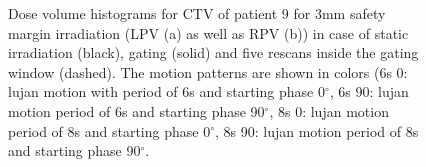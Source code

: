 \begin{figure}[H]
\begin{center}
{ }
\caption{Dose volume histograms for CTV of patient 9 for 3mm safety margin irradiation (LPV (a) as well as RPV (b)) in case of static 
irradiation (black), gating (solid) and five rescans inside the gating window (dashed). The motion patterns are shown in colors (6s 0: lujan motion with period of 6s 
and starting phase 0$^{\circ}$, 6s 90: lujan motion period of 6s and starting phase 90$^{\circ}$, 8s 0: lujan motion period of 8s 
and starting phase 0$^{\circ}$, 8s 90: lujan motion period of 8s and starting phase 90$^{\circ}$.}
\label{dvhs_pat09_mdacc_rescan}
 \end{center}
\end{figure}

\newpage

\begin{figure}[H]
\end{figure}
